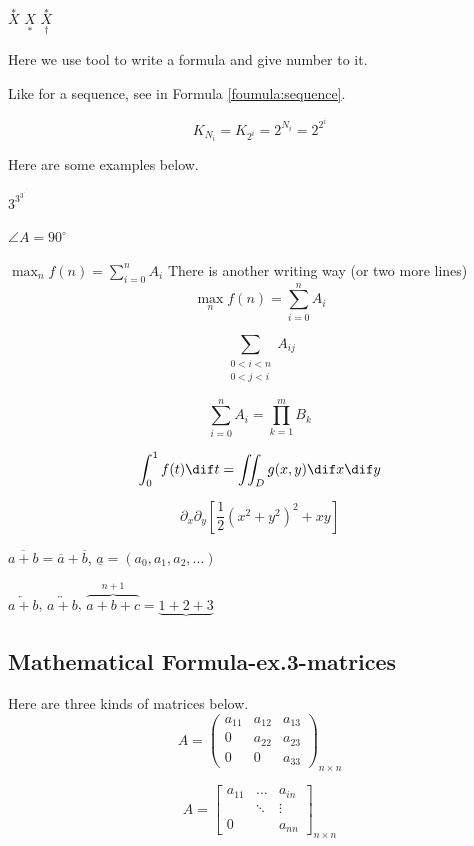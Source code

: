 $\overset{*}{X}$    \qquad
$\underset{*}{X}$   \qquad
$\overset{*}{\underset{\dag}{X}}$

Here we use tool to write a formula and give number to it.

Like for a sequence, see in Formula \ref{foumula:sequence}.

\begin{equation}
    K_{N_i} = K_{2^i} = 2^{N_i} = 2^{2^i}
    \label{foumula:sequence}
\end{equation}

Here are some examples below.

$3^{3^{3^{\cdot^{\cdot^{\cdot^3}}}}}$

$\angle A = 90^{\circ}$

$\max_n f(n) = \sum_{i=0}^n A_i$    \qquad
There is another writing way (or two more lines)
\[
    \max_n f(n) = \sum_{i=0}^n A_i
\]

\[
    \sum_{\substack{0<i<n \\ 0<j<i}} A_{ij}
\]

\[
    \sum_{i=0}^n A_i = \prod_{k=1}^m B_k
\]

\[
    \int_0^1 f(t) \dif t = \iint_D g(x,y) \dif x \dif y
\]

\[
    \partial_x \partial_y \left[
    \frac{1}{2} \left(x^2+y^2 \right)^2+xy
    \right]
\]

$\overline{a+b} = \overline{a} + \overline{b}$, 
$\underline a = (a_0, a_1, a_2, \dots)$

$\overleftarrow{a+b}$, 
$\overleftrightarrow{a+b}$, 
$\overbrace{a+b+c}^{\text{$n+1$}} = \underbrace{1+2+3}$

\subsection{Mathematical Formula-ex.3-matrices}
Here are three kinds of matrices below.
\[
    A = \begin{pmatrix}
            a_{11} & a_{12} & a_{13}    \\
            0 & a_{22} & a_{23}    \\
            0 & 0 & a_{33}
        \end{pmatrix}_{n\times n}
\]

\[
    A = \begin{bmatrix}
            a_{11} & \dots & a_{in} \\
              & \ddots & \vdots  \\
            0 &  & a_{nn}
        \end{bmatrix}_{n\times n}
\]


